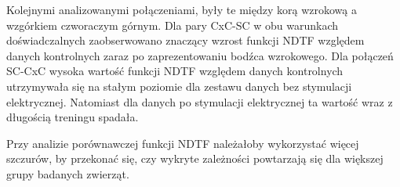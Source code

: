 \documentclass{pracamgr}
\begin{document}
	Kolejnymi analizowanymi połączeniami, były te między korą wzrokową a wzgórkiem czworaczym górnym. Dla pary CxC-SC w obu warunkach doświadczalnych zaobserwowano znaczący wzrost funkcji NDTF względem danych kontrolnych zaraz po zaprezentowaniu bodźca wzrokowego. Dla połączeń SC-CxC wysoka wartość funkcji NDTF względem danych kontrolnych utrzymywała się na stałym poziomie dla zestawu danych bez stymulacji elektrycznej. Natomiast dla danych po stymulacji elektrycznej ta wartość wraz z długością treningu spadała.
	
	Przy analizie porównawczej funkcji NDTF należałoby wykorzystać więcej szczurów, by przekonać się, czy wykryte zależności powtarzają się dla większej grupy badanych zwierząt.

	
	
\end{document}
